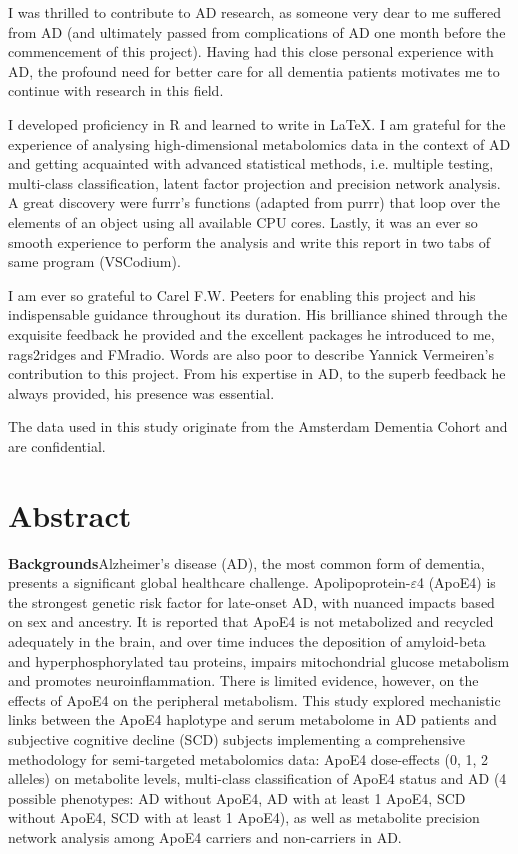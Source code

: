\documentclass{amsart}
\begin{document}
I was thrilled to contribute to AD research, as someone very dear to me suffered from AD (and ultimately passed from complications of AD one month before the commencement of this project). Having had this close personal experience with AD, the profound need for better care for all dementia patients motivates me to continue with research in this field.

I developed proficiency in R and learned to write in \LaTeX. I am grateful for the experience of analysing high-dimensional metabolomics data in the context of AD and getting acquainted with advanced statistical methods, i.e. multiple testing, multi-class classification, latent factor projection and precision network analysis. A great discovery were \textsf{furrr}'s functions (adapted from \textsf{purrr}) that loop over the elements of an object using all available CPU cores. Lastly, it was an ever so smooth experience to perform the analysis and write this report in two tabs of same program (VSCodium).

I am ever so grateful to Carel F.W. Peeters for enabling this project and his indispensable guidance throughout its duration. His brilliance shined through the exquisite feedback he provided and the excellent packages he introduced to me, \textsf{rags2ridges} and \textsf{FMradio}. Words are also poor to describe Yannick Vermeiren's contribution to this project. From his expertise in AD, to the superb feedback he always provided, his presence was essential.

The data used in this study originate from the Amsterdam Dementia Cohort and are confidential.


\newpage
\section*{Abstract}
\textbf{Backgrounds}\hspace{.1cm}Alzheimer's disease (AD), the most common form of dementia, presents a significant global healthcare challenge. Apolipoprotein-$\varepsilon$4 (ApoE4) is the strongest genetic risk factor for late-onset AD, with nuanced impacts based on sex and ancestry. It is reported that ApoE4 is not metabolized and recycled adequately in the brain, and over time induces the deposition of amyloid-beta and hyperphosphorylated tau proteins, impairs mitochondrial glucose metabolism and promotes neuroinflammation. There is limited evidence, however, on the effects of ApoE4 on the peripheral metabolism. This study explored mechanistic links between the ApoE4 haplotype and serum metabolome in AD patients and subjective cognitive decline (SCD) subjects implementing a comprehensive methodology for semi-targeted metabolomics data: ApoE4 dose-effects (0, 1, 2 alleles) on metabolite levels, multi-class classification of ApoE4 status and AD (4 possible phenotypes: AD without ApoE4, AD with at least 1 ApoE4, SCD without ApoE4, SCD with at least 1 ApoE4), as well as metabolite precision network analysis among ApoE4 carriers and non-carriers in AD.
\end{document}
